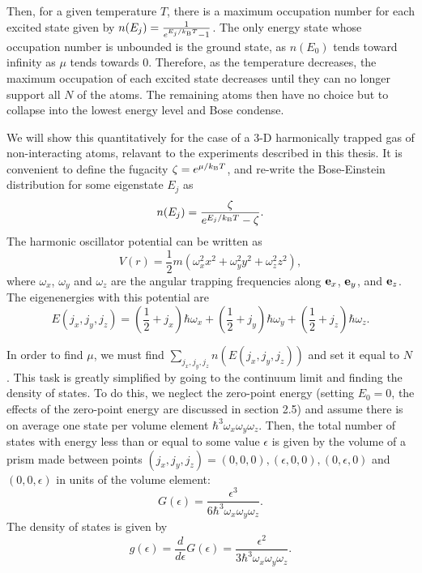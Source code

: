 Then, for a given temperature $T$, there is a maximum occupation number for each excited state given by $n(E_j) = \frac{1}{e^{E_j/k_{\rm B}T}-1}$. The only energy state whose occupation number is unbounded is the ground state, as $n(E_0)$ tends toward infinity as $\mu$ tends towards $0$. Therefore, as the temperature decreases, the maximum occupation of each excited state decreases until they can no longer support all $N$ of the atoms. The remaining atoms then have no choice but to collapse into the lowest energy level and Bose condense. 

We will show this quantitatively for the case of a 3-D harmonically trapped gas of non-interacting atoms, relavant to the experiments described in this thesis\cite{Ensher1996}. It is convenient to define the fugacity $\zeta=e^{\mu/k_{\rm B}T}$, and re-write the Bose-Einstein distribution for some 
eigenstate $E_j$ as
\begin{equation}
n(E_j) = \frac{\zeta}{e^{E_j/k_{\rm B}T}-\zeta}.
\end{equation}
The harmonic oscillator potential can be written as 
\begin{equation}
V(r) = \frac{1}{2} m (\omega_x^2 x^2 + \omega_y^2 y^2 + \omega_z^2 z^2),
\end{equation}
where $\omega_x$, $\omega_y$ and $\omega_z$ are the angular trapping frequencies along ${\bf e}_x$, ${\bf e}_y$, and ${\bf e}_z$.  The eigenenergies with this potential are
\begin{equation}
E(j_x,j_y,j_z) = (\frac{1}{2} + j_x)\hbar\omega_x +(\frac{1}{2} + j_y)\hbar\omega_y+(\frac{1}{2} + j_z)\hbar\omega_z.
\end{equation}

In order to find $\mu$, we must find $\sum_{j_x,j_y,j_z}n(E(j_x,j_y,j_z))$ and set it equal to $N$. This task is greatly simplified by going to the continuum limit and finding the density of states. To do this, we neglect the zero-point energy (setting $E_0=0$, the effects of the zero-point energy are discussed in \cite{Pethick} section 2.5)  and assume there is on average one state per volume element $\hbar^3 \omega_x \omega_y \omega_z$. Then, the total number of states with energy less than or equal to some value $\epsilon$ is given by the volume of a prism made between points $(j_x,j_y,j_z)=(0,0,0),(\epsilon,0,0),(0,\epsilon,0)$ and $(0,0,\epsilon)$ in units of the volume element:
\begin{equation}
G(\epsilon) = \frac{\epsilon^3}{6\hbar^3\omega_x \omega_y \omega_z}.
\label{eqn:numberOfStates}
\end{equation}
The density of states is given by 
\begin{equation}
g(\epsilon) = \frac{d}{d\epsilon} G(\epsilon) = \frac{\epsilon^2}{3\hbar^3\omega_x \omega_y \omega_z}. 
\label{eqn:densityOfStates}
\end{equation}

